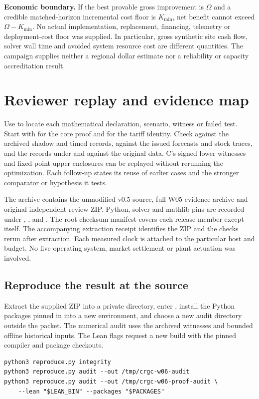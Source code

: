 \documentclass[10pt,letterpaper]{article}
\begin{document}
\textbf{Economic boundary.} If the best provable gross improvement is $\Omega$ and a credible matched-horizon incremental cost floor is $K_{\min}$, net benefit cannot exceed $\Omega-K_{\min}$. No actual implementation, replacement, financing, telemetry or deployment-cost floor was supplied. In particular, gross synthetic site cash flow, solver wall time and avoided system resource cost are different quantities. The campaign supplies neither a regional dollar estimate nor a reliability or capacity accreditation result.

\clearpage
\section*{Reviewer replay and evidence map}
Use  to locate each mathematical declaration, scenario, witness or failed test. Start with  for the core proof and  for the tariff identity. Check  against the archived shadow and timed records,  against the issued forecasts and stock traces, and the  records under  and  against the original data. C's signed lower witnesses and fixed-point upper enclosures can be replayed without rerunning the optimization. Each follow-up states its reuse of earlier cases and the stronger comparator or hypothesis it tests.

The archive contains the unmodified v0.5 source, full W05 evidence archive and original independent review ZIP. Python, solver and mathlib pins are recorded under , ,  and . The root checksum manifest covers each release member except itself. The accompanying extraction receipt identifies the ZIP and the checks rerun after extraction. Each measured clock is attached to the particular host and budget. No live operating system, market settlement or plant actuation was involved.

\subsection*{Reproduce the result at the source}
Extract the supplied ZIP into a private directory, enter , install the Python packages pinned in  into a new environment, and choose a new audit directory outside the packet. The numerical audit uses the archived witnesses and bounded offline historical inputs. The Lean flags request a new build with the pinned compiler and package checkouts.
\begin{verbatim}
python3 reproduce.py integrity
python3 reproduce.py audit --out /tmp/crgc-w06-audit
python3 reproduce.py audit --out /tmp/crgc-w06-proof-audit \
    --lean "$LEAN_BIN" --packages "$PACKAGES"
\end{verbatim}
\end{document}
